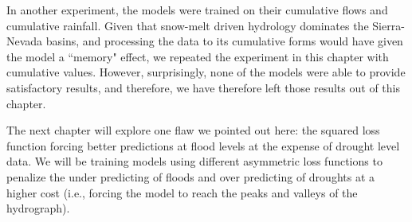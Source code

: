 In another experiment, the models were trained on their cumulative flows and cumulative rainfall. Given that snow-melt driven hydrology dominates the Sierra-Nevada basins, and processing the data to its cumulative forms would have given the model a ``memory" effect, we repeated the experiment in this chapter with cumulative values. However, surprisingly, none of the models were able to provide satisfactory results, and therefore, we have therefore left those results out of this chapter. 

The next chapter will explore one flaw we pointed out here: the squared loss function forcing better predictions at flood levels at the expense of drought level data. We will be training models using different asymmetric loss functions to penalize the under predicting of floods and over predicting of droughts at a higher cost (i.e., forcing the model to reach the peaks and valleys of the hydrograph). 

